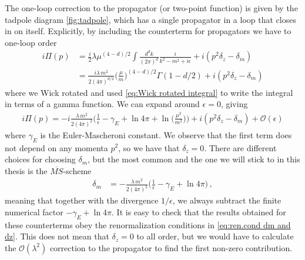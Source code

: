 The one-loop correction to the propagator (or two-point function) is given by the tadpole diagram \cref{fig:tadpole}, which has a single propagator in a loop that closes in on itself. Explicitly, by including the counterterm for propagators we have to one-loop order
\begin{align}
    i\Pi(p)&=\frac{i}{2}\lambda\mu^{(4-d)/2}\int\frac{d^{d}k}{(2\pi)^{d}}\frac{i}{k^{2}-m^{2}+i\epsilon}+i(p^{2}\delta_z-\delta_{m})\nonumber
    \\
    &=\frac{i\lambda\,m^{2}}{2(4\pi)^{d/2}}\Big(\frac{\mu}{m}\Big)^{(4-d)/2}\Gamma(1-d/2)+i(p^{2}\delta_z-\delta_{m})
\end{align}
where we Wick rotated and used \cref{eq:Wick rotated integral} to write the integral in terms of a gamma function. We can expand around $\epsilon=0$, giving
\begin{align}
    i\Pi(p)=-i\frac{\lambda\,m^{2}}{2(4\pi)^{2}}\Big(\frac{1}{\epsilon}-\gamma_{E}+\ln4\pi+\ln\Big(\frac{\mu^{2}}{m^{2}}\Big)\Big)+i(p^{2}\delta_z-\delta_{m})+\mathcal{O}(\epsilon)
\end{align}
where $\gamma_{E}$ is the Euler-Mascheroni constant. We observe that the first term does not depend on any momenta $p^{2}$, so we have that $\delta_{z}=0$. There are different choices for choosing $\delta_m$, but the most common and the one we will stick to in this thesis is the $\overline{MS}$-scheme
\begin{align}
    \delta_{m}&=-\frac{\lambda\,m^{2}}{2(4\pi)^{2}}\Big(\frac{1}{\epsilon}-\gamma_E+\ln 4\pi\Big)\,,
\end{align}
meaning that together with the divergence $1/\epsilon$, we always subtract the finite numerical factor $-\gamma_{E}+\ln 4\pi$. It is easy to check that the results obtained for these counterterms obey the renormalization conditions in \cref{eq:ren.cond dm and dz}. This does not mean that $\delta_{z}=0$ to all order, but we would have to calculate the $\mathcal{O}(\lambda^{2})$ correction to the propagator to find the first non-zero contribution. 

